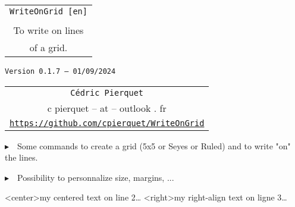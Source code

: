 \documentclass[a4paper]{article}
\def\TPversion{0.1.7}
\def\TPdate{01/09/2024}
\begin{document}
\pagestyle{fancy}

\thispagestyle{empty}

\vspace{2cm}

\begin{center}
	\begin{minipage}{0.75\linewidth}
	\begin{tcolorbox}[colframe=yellow,colback=yellow!15]
		\begin{center}
			\begin{tabular}{c}
				{\Huge \texttt{WriteOnGrid [en]}}\\
				\\
				{\LARGE To write on lines} \\
				{\LARGE of a grid.}
			\end{tabular}
			
			\medskip
			
			{\small \texttt{Version \TPversion{} -- \TPdate}}
		\end{center}
	\end{tcolorbox}
\end{minipage}
\end{center}

\vspace{0.5cm}

\begin{center}
	\begin{tabular}{c}
	\texttt{Cédric Pierquet}\\
	{\ttfamily c pierquet -- at -- outlook . fr}\\
	\texttt{\url{https://github.com/cpierquet/WriteOnGrid}}
\end{tabular}
\end{center}

\vspace{0.5cm}

{$\blacktriangleright$~~Some commands to create a grid (5x5 or Seyes or Ruled) and to write "on" the lines.}

\smallskip

{$\blacktriangleright$~~Possibility to personnalize size, margins, ...}

\vspace{1cm}

\begin{center}
	\begin{EnvGrid}[NumSquares=22x8]
	\WriteLine<center>{my centered text on line 2\ldots}
	\WriteLine<right>{my right-align text on ligne 3\ldots}
	\PassLine
\end{EnvGrid}
\end{center}
\end{document}
